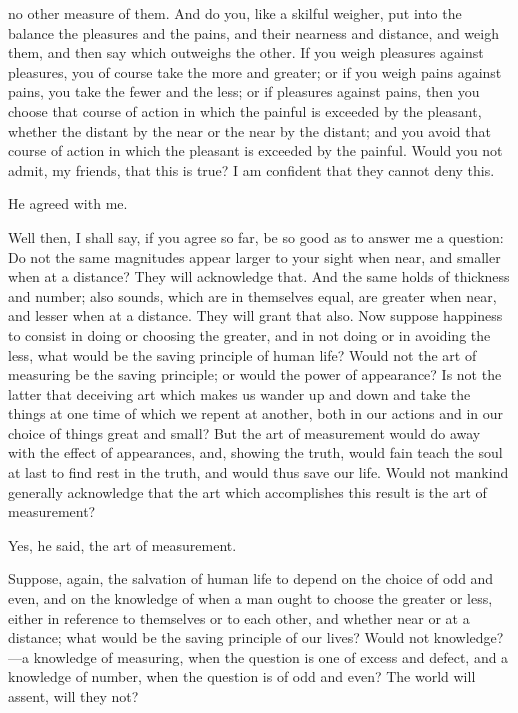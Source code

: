 \documentclass[11pt,letter]{article}
\begin{document}
no other measure of them. And do you, like a skilful weigher, put into the balance the pleasures and the pains, and their nearness and distance, and weigh them, and then say which outweighs the other. If you weigh pleasures against pleasures, you of course take the more and greater; or if you weigh pains against pains, you take the fewer and the less; or if pleasures against pains, then you choose that course of action in which the painful is exceeded by the pleasant, whether the distant by the near or the near by the distant; and you avoid that course of action in which the pleasant is exceeded by the painful. Would you not admit, my friends, that this is true? I am confident that they cannot deny this.

\par  He agreed with me.

\par  Well then, I shall say, if you agree so far, be so good as to answer me a question: Do not the same magnitudes appear larger to your sight when near, and smaller when at a distance? They will acknowledge that. And the same holds of thickness and number; also sounds, which are in themselves equal, are greater when near, and lesser when at a distance. They will grant that also. Now suppose happiness to consist in doing or choosing the greater, and in not doing or in avoiding the less, what would be the saving principle of human life? Would not the art of measuring be the saving principle; or would the power of appearance? Is not the latter that deceiving art which makes us wander up and down and take the things at one time of which we repent at another, both in our actions and in our choice of things great and small? But the art of measurement would do away with the effect of appearances, and, showing the truth, would fain teach the soul at last to find rest in the truth, and would thus save our life. Would not mankind generally acknowledge that the art which accomplishes this result is the art of measurement?

\par  Yes, he said, the art of measurement.

\par  Suppose, again, the salvation of human life to depend on the choice of odd and even, and on the knowledge of when a man ought to choose the greater or less, either in reference to themselves or to each other, and whether near or at a distance; what would be the saving principle of our lives? Would not knowledge?—a knowledge of measuring, when the question is one of excess and defect, and a knowledge of number, when the question is of odd and even? The world will assent, will they not?
\end{document}
